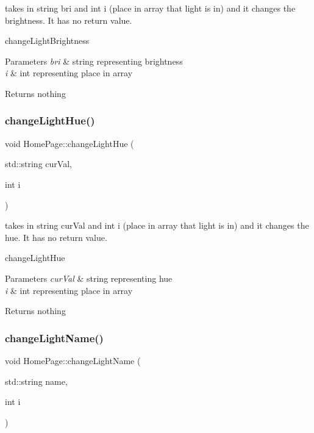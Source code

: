 takes in string bri and int i (place in array that light is in) and it changes the brightness. It has no return value. 

change\+Light\+Brightness 
\begin{DoxyParams}{Parameters}
{\em bri} & string representing brightness \\
\hline
{\em i} & int representing place in array \\
\hline
\end{DoxyParams}
\begin{DoxyReturn}{Returns}
nothing 
\end{DoxyReturn}
\mbox{\label{class_home_page_a5bae10f45d04af24bffdc168e87638a0}} 
\subsubsection{\texorpdfstring{change\+Light\+Hue()}{changeLightHue()}}
{\footnotesize\ttfamily void Home\+Page\+::change\+Light\+Hue (\begin{DoxyParamCaption}\item[{std\+::string}]{cur\+Val,  }\item[{int}]{i }\end{DoxyParamCaption})}



takes in string cur\+Val and int i (place in array that light is in) and it changes the hue. It has no return value. 

change\+Light\+Hue 
\begin{DoxyParams}{Parameters}
{\em cur\+Val} & string representing hue \\
\hline
{\em i} & int representing place in array \\
\hline
\end{DoxyParams}
\begin{DoxyReturn}{Returns}
nothing 
\end{DoxyReturn}
\mbox{\label{class_home_page_adbf50db3ccfa220970c05422495f308a}} 
\subsubsection{\texorpdfstring{change\+Light\+Name()}{changeLightName()}}
{\footnotesize\ttfamily void Home\+Page\+::change\+Light\+Name (\begin{DoxyParamCaption}\item[{std\+::string}]{name,  }\item[{int}]{i }\end{DoxyParamCaption})}



